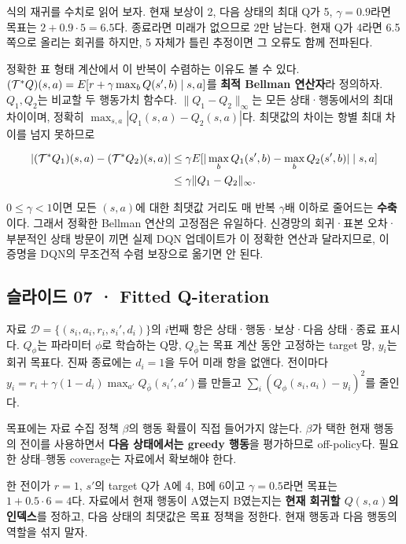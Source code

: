 \documentclass[11pt,a4paper]{article}
\begin{document}
식의 재귀를 수치로 읽어 보자. 현재 보상이 2, 다음 상태의 최대 Q가 5, $\gamma=0.9$라면 목표는 $2+0.9\cdot5=6.5$다. 종료라면 미래가 없으므로 2만 남는다. 현재 Q가 4라면 6.5 쪽으로 올리는 회귀를 하지만, 5 자체가 틀린 추정이면 그 오류도 함께 전파된다.\par

정확한 표 형태 계산에서 이 반복이 수렴하는 이유도 볼 수 있다. $({\cal T}^*Q)(s,a)=E[r+\gamma\max_b Q(s',b)\mid s,a]$를 \textbf{최적 Bellman 연산자}라 정의하자. $Q_1,Q_2$는 비교할 두 행동가치 함수다. $\|Q_1-Q_2\|_\infty$는 모든 상태·행동에서의 최대 차이이며, 정확히 $\max_{s,a}|Q_1(s,a)-Q_2(s,a)|$다. 최댓값의 차이는 항별 최대 차이를 넘지 못하므로\par

\[
\begin{aligned}
|({\cal T}^*Q_1)(s,a)-({\cal T}^*Q_2)(s,a)|
&\le\gamma E[|\max_bQ_1(s',b)-\max_bQ_2(s',b)|\mid s,a]\\
&\le\gamma\|Q_1-Q_2\|_\infty.
\end{aligned}
\]

$0\le\gamma<1$이면 모든 $(s,a)$에 대한 최댓값 거리도 매 반복 $\gamma$배 이하로 줄어드는 \textbf{수축}이다. 그래서 정확한 Bellman 연산의 고정점은 유일하다. 신경망의 회귀·표본 오차·부분적인 상태 방문이 끼면 실제 DQN 업데이트가 이 정확한 연산과 달라지므로, 이 증명을 DQN의 무조건적 수렴 보장으로 옮기면 안 된다.\par

\subsection{슬라이드 07 · Fitted Q-iteration}

자료 $\mathcal D=\{(s_i,a_i,r_i,s_i',d_i)\}$의 $i$번째 항은 상태·행동·보상·다음 상태·종료 표시다. $Q_\phi$는 파라미터 $\phi$로 학습하는 Q망, $Q_{\bar\phi}$는 목표 계산 동안 고정하는 target 망, $y_i$는 회귀 목표다. 진짜 종료에는 $d_i=1$을 두어 미래 항을 없앤다. 전이마다 $y_i=r_i+\gamma(1-d_i)\max_{a'}Q_{\bar\phi}(s_i',a')$를 만들고 $\sum_i(Q_\phi(s_i,a_i)-y_i)^2$를 줄인다.\par

목표에는 자료 수집 정책 $\beta$의 행동 확률이 직접 들어가지 않는다. $\beta$가 택한 현재 행동의 전이를 사용하면서 \textbf{다음 상태에서는 greedy 행동}을 평가하므로 off-policy다. 필요한 상태–행동 coverage는 자료에서 확보해야 한다.\par

한 전이가 $r=1$, $s'$의 target Q가 A에 4, B에 6이고 $\gamma=0.5$라면 목표는 $1+0.5\cdot6=4$다. 자료에서 현재 행동이 A였는지 B였는지는 \textbf{현재 회귀할 $Q(s,a)$의 인덱스}를 정하고, 다음 상태의 최댓값은 목표 정책을 정한다. 현재 행동과 다음 행동의 역할을 섞지 말자.\par
\end{document}
